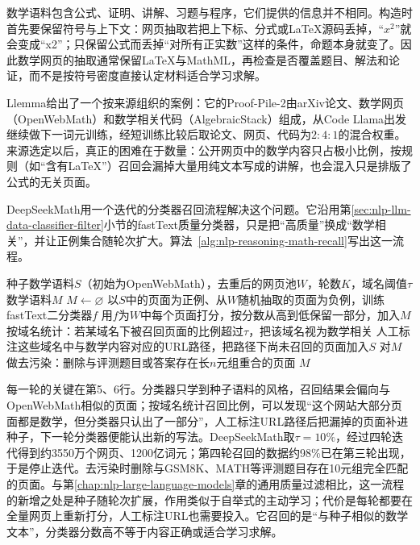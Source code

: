 数学语料包含公式、证明、讲解、习题与程序，它们提供的信息并不相同。构造时首先要保留符号与上下文：网页抽取若把上下标、分式或LaTeX源码丢掉，“$x^2$”就会变成“x2”；只保留公式而丢掉“对所有正实数”这样的条件，命题本身就变了。因此数学网页的抽取通常保留LaTeX与MathML，再检查是否覆盖题目、解法和论证，而不是按符号密度直接认定材料适合学习求解。

Llemma给出了一个按来源组织的案例：它的Proof-Pile-2由arXiv论文、数学网页（OpenWebMath）和数学相关代码（AlgebraicStack）组成，从Code Llama出发继续做下一词元训练，经短训练比较后取论文、网页、代码为$2:4:1$的混合权重。来源选定以后，真正的困难在于数量：公开网页中的数学内容只占极小比例，按规则（如“含有LaTeX”）召回会漏掉大量用纯文本写成的讲解，也会混入只是排版了公式的无关页面。

DeepSeekMath用一个迭代的分类器召回流程解决这个问题。它沿用第\ref{sec:nlp-llm-data-classifier-filter}小节的fastText质量分类器，只是把“高质量”换成“数学相关”，并让正例集合随轮次扩大。算法~\ref{alg:nlp-reasoning-math-recall}写出这一流程。

\begin{algorithm}[迭代召回数学网页]
  \label{alg:nlp-reasoning-math-recall}
  \begin{algorithmic}[1]
    \Require 种子数学语料$S$（初始为OpenWebMath），去重后的网页池$W$，轮数$K$，域名阈值$\tau$
    \Ensure 数学语料$M$
    \State $M\gets\varnothing$
      \State 以$S$中的页面为正例、从$W$随机抽取的页面为负例，训练fastText二分类器$f$
      \State 用$f$为$W$中每个页面打分，按分数从高到低保留一部分，加入$M$
      \State 按域名统计：若某域名下被召回页面的比例超过$\tau$，把该域名视为数学相关
      \State 人工标注这些域名中与数学内容对应的URL路径，把路径下尚未召回的页面加入$S$
    \EndFor
    \State 对$M$做去污染：删除与评测题目或答案存在长$n$元组重合的页面
    \State \Return $M$
  \end{algorithmic}
\end{algorithm}

每一轮的关键在第5、6行。分类器只学到种子语料的风格，召回结果会偏向与OpenWebMath相似的页面；按域名统计召回比例，可以发现“这个网站大部分页面都是数学，但分类器只认出了一部分”，人工标注URL路径后把漏掉的页面补进种子，下一轮分类器便能认出新的写法。DeepSeekMath取$\tau=10\%$，经过四轮迭代得到约3550万个网页、1200亿词元；第四轮召回的数据约98\%已在第三轮出现，于是停止迭代。去污染时删除与GSM8K、MATH等评测题目存在10元组完全匹配的页面。与第\ref{chap:nlp-large-language-models}章的通用质量过滤相比，这一流程的新增之处是种子随轮次扩展，作用类似于自举式的主动学习；代价是每轮都要在全量网页上重新打分，人工标注URL也需要投入。它召回的是“与种子相似的数学文本”，分类器分数高不等于内容正确或适合学习求解。

